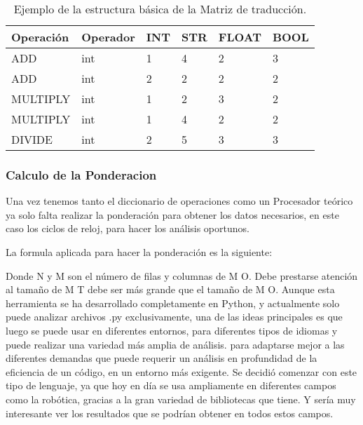 \begin{table}[htbp]
\begin{center}
\begin{tabular}{|l|l|l|l|l|l|}
\hline
Operación & Operador & INT & STR & FLOAT & BOOL \\
\hline \hline
ADD & int & 1 & 4 & 2 & 3\\ \hline
ADD & int & 2 & 2 & 2 & 2 \\ \hline
MULTIPLY & int & 1 & 2 & 3 & 2 \\ \hline
MULTIPLY & int & 1 & 4 & 2 & 2 \\ \hline
DIVIDE & int & 2 & 5 & 3 & 3 \\ \hline
\end{tabular}
\caption{Ejemplo de la estructura básica de la Matriz de traducción.}

\label{tabla:sencilla}
\end{center}
\end{table}



\subsubsection{Calculo de la Ponderacion}
Una vez tenemos tanto el diccionario de operaciones como un Procesador teórico ya solo falta realizar la ponderación para obtener los datos necesarios, en este caso los ciclos de reloj, para hacer los análisis oportunos. 

La formula aplicada para hacer la ponderación es la siguiente:


Donde N y M son el número de filas y columnas de M O. Debe prestarse atención al tamaño de M T debe ser más grande que el tamaño de M O.
Aunque esta herramienta se ha desarrollado completamente en Python, y actualmente solo puede analizar archivos .py exclusivamente, una de las ideas principales es que luego se puede usar en diferentes entornos, para diferentes tipos de idiomas y puede realizar una variedad más amplia de análisis. para adaptarse mejor a las diferentes demandas que puede requerir un análisis en profundidad de la eficiencia de un código, en un entorno más exigente. Se decidió comenzar con este tipo de lenguaje, ya que hoy en día se usa ampliamente en diferentes campos como la robótica, gracias a la gran variedad de bibliotecas que tiene. Y sería muy interesante ver los resultados que se podrían obtener en todos estos campos.


